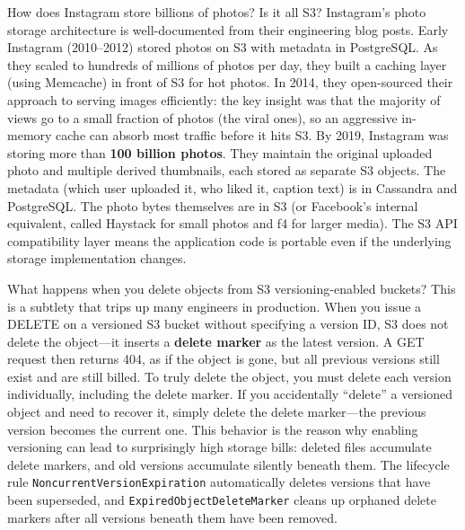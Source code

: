 \documentclass[11pt,a4paper]{article}
\begin{document}
\begin{curiobox}{How does Instagram store billions of photos? Is it all S3?}
Instagram's photo storage architecture is well-documented from their engineering blog posts. Early Instagram (2010--2012) stored photos on S3 with metadata in PostgreSQL. As they scaled to hundreds of millions of photos per day, they built a caching layer (using Memcache) in front of S3 for hot photos. In 2014, they open-sourced their approach to serving images efficiently: the key insight was that the majority of views go to a small fraction of photos (the viral ones), so an aggressive in-memory cache can absorb most traffic before it hits S3. By 2019, Instagram was storing more than \textbf{100 billion photos}. They maintain the original uploaded photo and multiple derived thumbnails, each stored as separate S3 objects. The metadata (which user uploaded it, who liked it, caption text) is in Cassandra and PostgreSQL. The photo bytes themselves are in S3 (or Facebook's internal equivalent, called Haystack for small photos and f4 for larger media). The S3 API compatibility layer means the application code is portable even if the underlying storage implementation changes.
\end{curiobox}

\begin{curiobox}{What happens when you delete objects from S3 versioning-enabled buckets?}
This is a subtlety that trips up many engineers in production. When you issue a DELETE on a versioned S3 bucket without specifying a version ID, S3 does not delete the object---it inserts a \textbf{delete marker} as the latest version. A GET request then returns 404, as if the object is gone, but all previous versions still exist and are still billed. To truly delete the object, you must delete each version individually, including the delete marker. If you accidentally ``delete'' a versioned object and need to recover it, simply delete the delete marker---the previous version becomes the current one. This behavior is the reason why enabling versioning can lead to surprisingly high storage bills: deleted files accumulate delete markers, and old versions accumulate silently beneath them. The lifecycle rule \texttt{NoncurrentVersionExpiration} automatically deletes versions that have been superseded, and \texttt{ExpiredObjectDeleteMarker} cleans up orphaned delete markers after all versions beneath them have been removed.
\end{curiobox}

\end{document}
